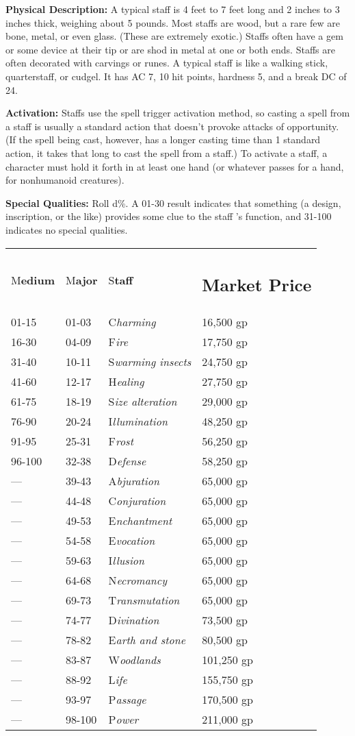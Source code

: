 \documentclass{article}
\begin{document}
\textbf{Physical Description:} A typical staff is 4 feet to 7 feet long and 2 inches 
to 3 inches thick, weighing about 5 pounds. Most staffs are wood, but a rare few 
are bone, metal, or even glass. (These are extremely exotic.) Staffs often have 
a gem or some device at their tip or are shod in metal at one or both ends. Staffs 
are often decorated with carvings or runes. A typical staff is like a walking stick, 
quarterstaff, or cudgel. It has AC 7, 10 hit points, hardness 5, and a break DC 
of 24.

\textbf{Activation:} Staffs use the spell trigger activation method, so casting 
a spell from a staff is usually a standard action that doesn't provoke attacks 
of opportunity. (If the spell being cast, however, has a longer casting time than 
1 standard action, it takes that long to cast the spell from a staff.) To activate 
a staff, a character must hold it forth in at least one hand (or whatever passes 
for a hand, for nonhumanoid creatures).

\textbf{Special Qualities:} Roll d\%. A 01-30 result indicates that something (a 
design, inscription, or the like) provides some clue to the staff 's function, 
and 31-100 indicates no special qualities.

\begin{tabular}{|>{\raggedright}p{40pt}|>{\raggedright}p{34pt}|>{\raggedright}p{74pt}|>{\raggedright}p{60pt}|}
\hline
\multicolumn{4}{|p{209pt}|}{T\textbf{able: Staffs}}\tabularnewline
\hline
M\textbf{edium} & M\textbf{ajor} & S\textbf{taff} & \subsection*{M\textbf{arket 
Price}}\tabularnewline
\hline
01-15 & 01-03 & C\textit{harming} & 16,500 gp\tabularnewline
\hline
16-30 & 04-09 & F\textit{ire} & 17,750 gp\tabularnewline
\hline
31-40 & 10-11 & S\textit{warming insects} & 24,750 gp\tabularnewline
\hline
41-60 & 12-17 & H\textit{ealing} & 27,750 gp\tabularnewline
\hline
61-75 & 18-19 & S\textit{ize alteration} & 29,000 gp\tabularnewline
\hline
76-90 & 20-24 & I\textit{llumination} & 48,250 gp\tabularnewline
\hline
91-95 & 25-31 & F\textit{rost} & 56,250 gp\tabularnewline
\hline
96-100 & 32-38 & D\textit{efense} & 58,250 gp\tabularnewline
\hline
--- & 39-43 & A\textit{bjuration} & 65,000 gp\tabularnewline
\hline
--- & 44-48 & C\textit{onjuration} & 65,000 gp\tabularnewline
\hline
--- & 49-53 & E\textit{nchantment} & 65,000 gp\tabularnewline
\hline
--- & 54-58 & E\textit{vocation} & 65,000 gp\tabularnewline
\hline
--- & 59-63 & I\textit{llusion} & 65,000 gp\tabularnewline
\hline
--- & 64-68 & N\textit{ecromancy} & 65,000 gp\tabularnewline
\hline
--- & 69-73 & T\textit{ransmutation} & 65,000 gp\tabularnewline
\hline
--- & 74-77 & D\textit{ivination} & 73,500 gp\tabularnewline
\hline
--- & 78-82 & E\textit{arth and stone} & 80,500 gp\tabularnewline
\hline
--- & 83-87 & W\textit{oodlands} & 101,250 gp\tabularnewline
\hline
--- & 88-92 & L\textit{ife} & 155,750 gp\tabularnewline
\hline
--- & 93-97 & P\textit{assage} & 170,500 gp\tabularnewline
\hline
--- & 98-100 & P\textit{ower} & 211,000 gp\tabularnewline
\hline
\end{tabular}
\end{document}
